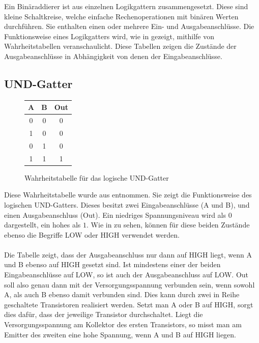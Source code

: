 Ein Binäraddierer ist aus einzelnen Logikgattern zusammengesetzt. Diese sind kleine Schaltkreise, welche einfache Rechenoperationen mit binären Werten durchführen. Sie enthalten einen oder mehrere Ein- und Ausgabeanschlüsse. Die Funktionsweise eines Logikgatters wird, wie in \cite{rigotti2003digitale} gezeigt, mithilfe von Wahrheitstabellen veranschaulicht. Diese Tabellen zeigen die Zustände der Ausgabeanschlüsse in Abhängigkeit von denen der Eingabeanschlüsse.

\subsection{UND-Gatter}
\begin{figure}[h]
	\centering
	\hspace{1cm}
	\begin{tabular}{|c|c|c|}
		\hline
		\textbf{A} & \textbf{B} & \textbf{Out} \\
		\hline
		0 & 0 & 0 \\
		1 & 0 & 0 \\
		0 & 1 & 0 \\
		1 & 1 & 1 \\
		\hline
	\end{tabular}
	\caption{Wahrheitstabelle für das logische UND-Gatter}
\end{figure}
Diese Wahrheitstabelle wurde aus \cite{rigotti2003digitale} entnommen. Sie zeigt die Funktionsweise des logischen UND-Gatters. Dieses besitzt zwei Eingabeanschlüsse (A und B), und einen Ausgabeanschluss (Out). Ein niedriges Spannungsniveau wird als $0$ dargestellt, ein hohes als $1$. Wie in \cite{neuser2008erstellung} zu sehen, können für diese beiden Zustände ebenso die Begriffe \glqq{}LOW\grqq{} oder \glqq{}HIGH\grqq{} verwendet werden.\\\\
Die Tabelle zeigt, dass der Ausgabeanschluss nur dann auf HIGH liegt, wenn A und B ebenso auf HIGH gesetzt sind. Ist mindestens einer der beiden Eingabeanschlüsse auf LOW, so ist auch der Ausgabeanschluss auf LOW. Out soll also genau dann mit der Versorgungsspannung verbunden sein, wenn sowohl A, als auch B ebenso damit verbunden sind. Dies kann durch zwei in Reihe geschaltete Transistoren realisiert werden. Setzt man A oder B auf HIGH, sorgt dies dafür, dass der jeweilige Transistor durchschaltet. Liegt die Versorgungsspannung am Kollektor des ersten Transistors, so misst man am Emitter des zweiten eine hohe Spannung, wenn A und B auf HIGH liegen.
\newpage
